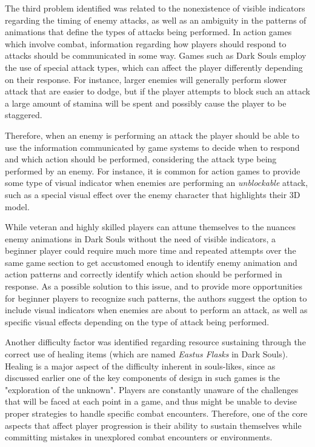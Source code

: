 The third problem identified was related to the nonexistence of visible indicators regarding the timing of enemy attacks, as well as an ambiguity in the patterns of animations that define the types of attacks being performed. In action games which involve combat, information regarding how players should respond to attacks should be communicated in some way. Games such as Dark Souls employ the use of special attack types, which can affect the player differently depending on their response. For instance, larger enemies will generally perform slower attack that are easier to dodge, but if the player attempts to block such an attack a large amount of stamina will be spent and possibly cause the player to be staggered.

Therefore, when an enemy is performing an attack the player should be able to use the information communicated by game systems to decide when to respond and which action should be performed, considering the attack type being performed by an enemy. For instance, it is common for action games to provide some type of visual indicator when enemies are performing an \emph{unblockable} attack, such as a special visual effect over the enemy character that highlights their 3D model.

While veteran and highly skilled players can attune themselves to the nuances enemy animations in Dark Souls without the need of visible indicators, a beginner player could require much more time and repeated attempts over the same game section to get accustomed enough to identify enemy animation and action patterns and correctly identify which action should be performed in response. As a possible solution to this issue, and to provide more opportunities for beginner players to recognize such patterns, the authors suggest the option to include visual indicators when enemies are about to perform an attack, as well as specific visual effects depending on the type of attack being performed.  

Another difficulty factor was identified regarding resource sustaining through the correct use of healing items (which are named \emph{Eastus Flasks} in Dark Souls). Healing is a major aspect of the difficulty inherent in souls-likes, since as discussed earlier one of the key components of design in such games is the "exploration of the unknown". Players are constantly unaware of the challenges that will be faced at each point in a game, and thus might be unable to devise proper strategies to handle specific combat encounters. Therefore, one of the core aspects that affect player progression is their ability to sustain themselves while committing mistakes in unexplored combat encounters or environments.


